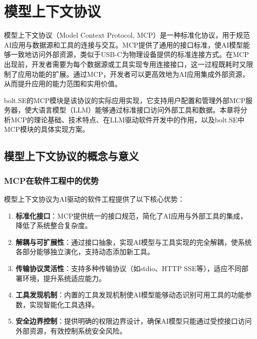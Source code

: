 
\chapter{模型上下文协议}
\label{chap:mcp}

模型上下文协议（Model Context Protocol, MCP）是一种标准化协议，用于规范AI应用与数据源和工具的连接与交互。MCP提供了通用的接口标准，使AI模型能够一致地访问外部资源，类似于USB-C为物理设备提供的标准连接方式。在MCP出现前，开发者需要为每个数据源或工具实现专用连接接口，这一过程既耗时又限制了应用功能的扩展。通过MCP，开发者可以更高效地为AI应用集成外部资源，从而提升应用的能力范围和实用价值\cite{mcpspec2023}。

bolt.SE的MCP模块是该协议的实际应用实现，它支持用户配置和管理外部MCP服务器，使大语言模型（LLM）能够通过标准接口访问外部工具和数据。本章将分析MCP的理论基础、技术特点、在LLM驱动软件开发中的作用，以及bolt.SE中MCP模块的具体实现方案。

\section{模型上下文协议的概念与意义}

\subsection{MCP在软件工程中的优势}
模型上下文协议为AI驱动的软件工程提供了以下核心优势：

\begin{enumerate}
  \item \textbf{标准化接口}：MCP提供统一的接口规范，简化了AI应用与外部工具的集成，降低了系统整合复杂度。
  
  \item \textbf{解耦与可扩展性}：通过接口抽象，实现AI模型与工具实现的完全解耦，使系统各部分能够独立演化，支持动态添加新工具。
  
  \item \textbf{传输协议灵活性}：支持多种传输协议（如stdio、HTTP SSE等），适应不同部署环境，提升系统适应能力。
  
  \item \textbf{工具发现机制}：内置的工具发现机制使AI模型能够动态识别可用工具的功能参数，实现智能化工具选择。
  
  \item \textbf{安全边界控制}：提供明确的权限边界设计，确保AI模型只能通过受控接口访问外部资源，有效控制系统安全风险。
\end{enumerate}

